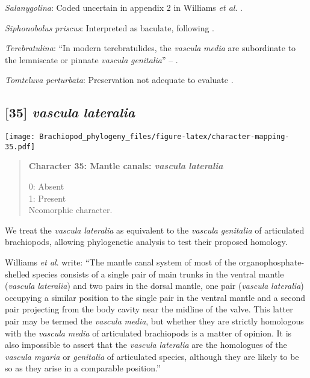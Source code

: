 \documentclass[openany]{book}
\theoremstyle{definition}
\theoremstyle{definition}
\theoremstyle{definition}
\theoremstyle{remark}
\begin{document}
\hypertarget{Salanygolina-coding-34}{}
\emph{Salanygolina}: Coded uncertain in appendix 2 in Williams \emph{et
al}. \citeyearpar{Williams1998Thediversity}.

\hypertarget{Siphonobolus_priscus-coding-34}{}
\emph{Siphonobolus priscus}: Interpreted as baculate, following
\citet{Havlicek1982LingulaceaPaterinacea}.

\hypertarget{Terebratulina-coding-34}{}
\emph{Terebratulina}: ``In modern terebratulides, the \emph{vascula}
\emph{media} are subordinate to the lemniscate or pinnate \emph{vascula}
\emph{genitalia}'' -- \citet{Williams1997Introduction}.

\hypertarget{Tomteluva_perturbata-coding-34}{}
\emph{Tomteluva perturbata}: Preservation not adequate to evaluate
\citep{Streng2016Anew}.

\subsection*{\texorpdfstring{{[}35{]} \emph{vascula}
\emph{lateralia}}{{[}35{]} vascula lateralia}}\label{vascula-lateralia}

\texttt{[image: Brachiopod\_phylogeny\_files/figure-latex/character-mapping-35.pdf]}

\begin{quote}
\textbf{Character 35: Mantle canals: \emph{vascula} \emph{lateralia}}

0: Absent\\
1: Present\\
Neomorphic character.
\end{quote}

We treat the \emph{vascula} \emph{lateralia} as equivalent to the
\emph{vascula} \emph{genitalia} of articulated brachiopods, allowing
phylogenetic analysis to test their proposed homology.

Williams \emph{et al}. \citeyearpar{Williams1997Introduction} write:
``The mantle canal system of most of the organophosphate-shelled species
consists of a single pair of main trunks in the ventral mantle
(\emph{vascula} \emph{lateralia}) and two pairs in the dorsal mantle,
one pair (\emph{vascula} \emph{lateralia}) occupying a similar position
to the single pair in the ventral mantle and a second pair projecting
from the body cavity near the midline of the valve. This latter pair may
be termed the \emph{vascula} \emph{media}, but whether they are strictly
homologous with the \emph{vascula} \emph{media} of articulated
brachiopods is a matter of opinion. It is also impossible to assert that
the \emph{vascula} \emph{lateralia} are the homologues of the
\emph{vascula} \emph{myaria} or \emph{genitalia} of articulated species,
although they are likely to be so as they arise in a comparable
position.''
\end{document}
